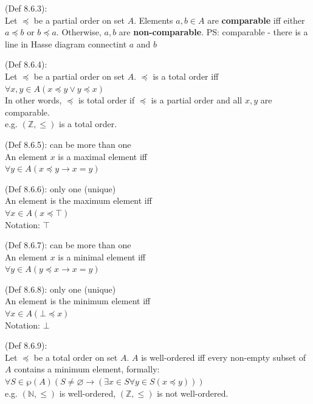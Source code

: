 \documentclass[10pt,landscape,a4paper]{article}
\newenvironment{descitemize} %
{\begin{description}[leftmargin=*,before=\let\makelabel\descitemlabel]}
	{\end{description}}
\newcommand{\descitemlabel}[1]{%
	\textbullet\ \textbf{#1}%
}
\begin{document}
\begin{multicols*}{4}
\begin{descitemize}
			\item [Comparable] (Def 8.6.3):\\
			Let $\preceq$ be a partial order on set $A$. Elements $a,b\in A$ are \textbf{comparable} iff either $a\preceq b$ or $b\preceq a$. Otherwise, $a,b$ are \textbf{non-comparable}.
			PS: comparable - there is a line in Hasse diagram connectint $a$ and $b$
			
			\item [Total order (or linear order)] (Def 8.6.4):\\
			Let $\preceq$ be a partial order on set $A$. $\preceq$ is a total order iff $\forall x,y\in A (x\preceq y \lor y\preceq x)$\\
			In other words, $\preceq$ is total order if $\preceq$ is a partial order and all $x,y$ are comparable.\\
			e.g. $(\mathbb{Z},\leq)$ is a total order.
			
			\item [Maximal] (Def 8.6.5): can be more than one\\
			An element $x$ is a maximal element iff\\
			$\forall y \in A (x\preceq y \rightarrow x=y)$
			
			\item [Maximum] (Def 8.6.6): only one (unique)\\
			An element is the maximum element iff\\
			$\forall x \in A(x \preceq \top)$\\
			Notation: $\top$
			
			\item [Minimal] (Def 8.6.7): can be more than one\\
			An element $x$ is a minimal element iff\\
			$\forall y \in A(y\preceq x \rightarrow x=y)$
			
			\item [Minimum] (Def 8.6.8): only one (unique)\\
			An element is the minimum element iff\\
			$\forall x\in A(\bot \preceq x)$\\
			Notation: $\bot$
			
			\item [Well-ordering of Total Orders] (Def 8.6.9):\\
			Let $\preceq$ be a total order on set $A$. $A$ is well-ordered iff every non-empty subset of $A$ contains a minimum element, formally:\\
			$\forall S \in \wp(A) (S\neq \varnothing \rightarrow(\exists x\in S \forall y \in S (x \preceq y)))$\\
			e.g. $(\mathbb{N}, \leq)$ is well-ordered, $(\mathbb{Z}, \leq)$ is not well-ordered.
			

\end{descitemize}
\end{multicols*}
\end{document}
